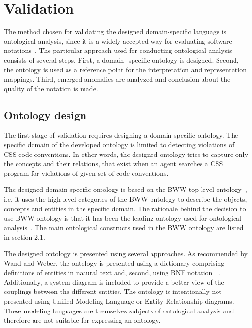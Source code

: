 \documentclass[parskip=full]{uvamscse}
\begin{document}
\section{Validation}

The method chosen for validating the designed domain-specific language is ontological analysis,
since it is a widely-accepted way for evaluating software notations~\cite{opdahl2002ontological,
green2000integrated, moody2009physics, parsons1997using, weber1996analytical}. The particular
approach used for conducting ontological analysis consists of several steps. First, a domain-
specific ontology is designed. Second, the ontology is used as a reference point for the
interpretation and representation mappings. Third, emerged anomalies are analyzed and conclusion
about the quality of the notation is made.

\subsection{Ontology design}

The first stage of validation requires designing a domain-specific ontology. The specific domain of
the developed ontology is limited to detecting violations of CSS code conventions. In other words,
the designed ontology tries to capture only the concepts and their relations, that exist when an
agent searches a CSS program for violations of given set of code conventions.

The designed domain-specific ontology is based on the BWW top-level
ontology~\cite{wand1990ontological}, i.e. it uses the high-level categories of the BWW ontology to
describe the objects, concepts and entities in the specific domain. The rationale behind the
decision to use BWW ontology is that it has been the leading ontology used for ontological
analysis~\cite{moody2009physics}. The main ontological constructs used in the BWW ontology are
listed in section 2.1.

The designed ontology is presented using several approaches. As recommended by Wand and Weber, the
ontology is presented using a dictionary comprising definitions of entities in natural text and,
second, using BNF notation~\cite{wand1995deep}~\cite{rosemann2002developing}. Additionally, a system
diagram is included to provide a better view of the couplings between the different entities. The
ontology is intentionally not presented using Unified Modeling Language or Entity-Relationship
diagrams. These modeling languages are themselves subjects of ontological analysis and therefore are
not suitable for expressing an ontology.
\end{document}
